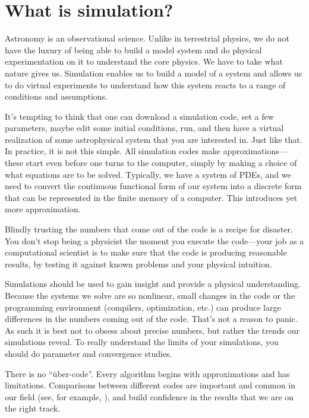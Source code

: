 \section{What is simulation?}

Astronomy is an observational science.  Unlike in terrestrial physics,
we do not have the luxury of being able to build a model system and do
physical experimentation on it to understand the core physics.  We
have to take what nature gives us.  Simulation enables us to build a
model of a system and allows us to do virtual experiments to
understand how this system reacts to a range of conditions and
assumptions.

It's tempting to think that one can download a simulation code, set a
few parameters, maybe edit some initial conditions, run, and then have
a virtual realization of some astrophysical system that you are
interested in.  Just like that.  In practice, it is not this simple.
All simulation codes make approximations---these start even before one
turns to the computer, simply by making a choice of what equations are
to be solved.  Typically, we have a system of PDEs, and we need to
convert the continuous functional form of our system into a discrete
form that can be represented in the finite memory of a computer.  This
introduces yet more approximation.


Blindly trusting the numbers that come out of the code is a recipe
for disaster.  You don't stop being a physicist the moment you execute
the code---your job as a computational scientist is to make sure that
the code is producing reasonable results, by testing it against known
problems and your physical intuition.

Simulations should be used to gain insight and provide a physical
understanding.  Because the systems we solve are so nonlinear, small
changes in the code or the programming environment (compilers,
optimization, etc.)  can produce large differences in the numbers
coming out of the code.  That's not a reason to panic.  As such it is
best not to obsess about precise numbers, but rather the trends our
simulations reveal.  To really understand the limits of your
simulations, you should do parameter and convergence studies.

There is no ``\"uber-code''.  Every algorithm begins with
approximations and has limitations.  Comparisons between different
codes are important and common in our field (see, for example,
\cite{frenk:1999,dimonte:2004,devalborro:2006}), and build confidence
in the results that we are on the right track.

